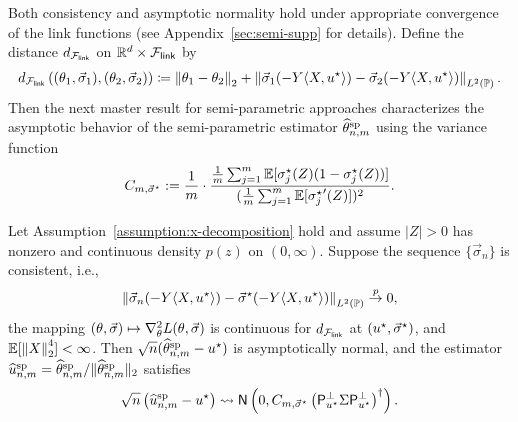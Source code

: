 Both consistency and
asymptotic normality hold under appropriate convergence of
the link functions (see Appendix~\ref{sec:semi-supp} for details).
Define the distance $d_{\mathcal{F}_{\mathsf{link}}}$ on $\mathbb{R}^d
\times \mathcal{F}_{\mathsf{link}}$ by
\begin{align}
  d_{\mathcal{F}_{\mathsf{link}}}\left((\theta_1, \vec{\sigma}_1), (\theta_2, \vec{\sigma}_2)
  \right)
  \coloneqq
  \left\|{\theta_1 - \theta_2}\right\|_2
  + \left\|{\vec{\sigma}_1(-Y\langle X, u^\star\rangle)
    - \vec{\sigma}_2(-Y\langle X, u^\star\rangle)}\right\|_{L^2(\mathbb{P})}.
  \label{eqn:link-distance}
\end{align}
Then
the next master result for semi-parametric
approaches characterizes the asymptotic behavior of the
semi-parametric estimator $\widehat{\theta}^{\textup{sp}}_{n,m}$ using the variance function
\begin{align*}
  C_{m, \vec{\sigma}^\star} := \frac{1}{m} \cdot
  \frac{\frac{1}{m} \sum_{j = 1}^m \mathbb{E}[\sigma_j^\star(Z) (1 - \sigma_j^\star(Z))]}{
    (\frac{1}{m} \sum_{j = 1}^m
    \mathbb{E}[{\sigma_j^\star}'(Z)])^2}.
\end{align*} 
\begin{theorem}
  \label{theorem:semiparametric-master-informal}
  Let Assumption~\ref{assumption:x-decomposition} hold and assume $|Z| > 0$
  has nonzero and continuous density $p(z)$ on $(0, \infty)$.  Suppose the
  sequence $\{\vec{\sigma}_n\}$ is consistent, i.e.,
  \begin{equation*}
    \left\|{\vec{\sigma}_n(-Y\langle X, u^\star\rangle)
      - \vec{\sigma}^\star(-Y\langle X, u^\star\rangle)}\right\|_{L^2(\mathbb{P})}
    \stackrel{p}{\rightarrow} 0,
  \end{equation*}
  the mapping $(\theta, \vec{\sigma}) \mapsto
  \nabla_\theta^2 L(\theta,
  \vec{\sigma})$ is continuous for $d_{\mathcal{F}_{\mathsf{link}}}$ at $(u^\star,
  \vec{\sigma}^\star)$, and $\mathbb{E} [\left\|{X}\right\|_2^4] < \infty$.  Then $\sqrt{n}(\widehat{\theta}^{\textup{sp}}_{n,m} - u^\star)$ is
  asymptotically normal, and the estimator $\widehat{u}^{\textup{sp}}_{n,m} =
  \widehat{\theta}^{\textup{sp}}_{n,m} / \|{\widehat{\theta}^{\textup{sp}}_{n,m}}\|_2$ satisfies
  \begin{equation*}
    \sqrt{n} \left({\widehat{u}^{\textup{sp}}_{n,m} - u^\star}\right)
    \rightsquigarrow \mathsf{N}\left({0, 	C_{m, \vec{\sigma}^\star}
      \left({\mathsf{P}_{u^\star}^\perp \Sigma \mathsf{P}_{u^\star}^\perp}\right)^\dagger}\right).
  \end{equation*}
\end{theorem}
